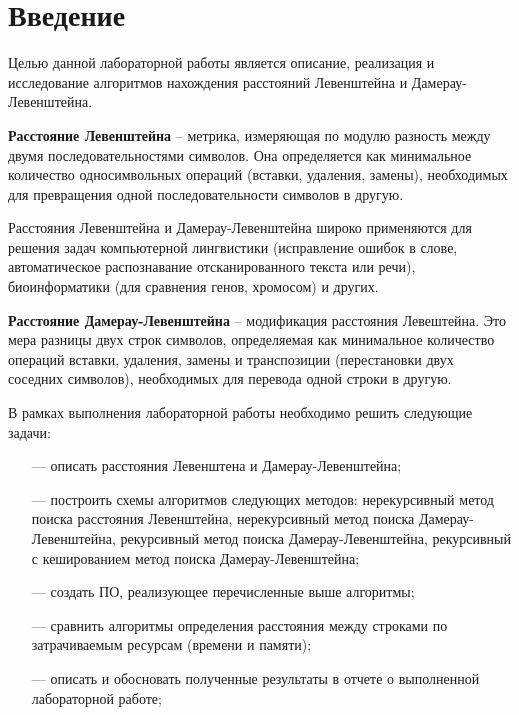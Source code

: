 \chapter*{Введение}

Целью данной лабораторной работы является описание, реализация и исследование алгоритмов нахождения расстояний Левенштейна и Дамерау-Левенштейна.

\bigskip

\textbf{Расстояние Левенштейна} -- метрика, измеряющая по модулю разность между двумя последовательностями символов. Она определяется как минимальное количество односимвольных операций (вставки, удаления, замены), необходимых для превращения одной последовательности символов в другую.

\bigskip

Расстояния Левенштейна и  Дамерау-Левенштейна широко применяются для решения задач компьютерной лингвистики (исправление ошибок в слове, автоматическое распознавание отсканированного текста или речи), биоинформатики (для сравнения генов, хромосом) и других.

\textbf{Расстояние Дамерау-Левенштейна} -- модификация расстояния Левештейна. Это мера разницы двух строк символов, определяемая как минимальное количество операций вставки, удаления, замены и транспозиции (перестановки двух соседних символов), необходимых для перевода одной строки в другую.

\bigskip

В рамках выполнения лабораторной работы необходимо решить следующие задачи:

\begin{itemize}
	\item[---] описать расстояния Левенштена и Дамерау-Левенштейна;
	\item[---] построить схемы алгоритмов следующих методов: нерекурсивный метод поиска расстояния Левенштейна, нерекурсивный метод поиска Дамерау-Левенштейна, рекурсивный метод поиска Дамерау-Левенштейна, рекурсивный с кешированием метод поиска Дамерау-Левенштейна;
	\item[---] создать ПО, реализующее перечисленные выше алгоритмы;
	\item[---] сравнить алгоритмы определения расстояния между строками по затрачиваемым ресурсам (времени и памяти);
	\item[---] описать и обосновать полученные результаты в отчете о выполненной лабораторной работе;
\end{itemize}
